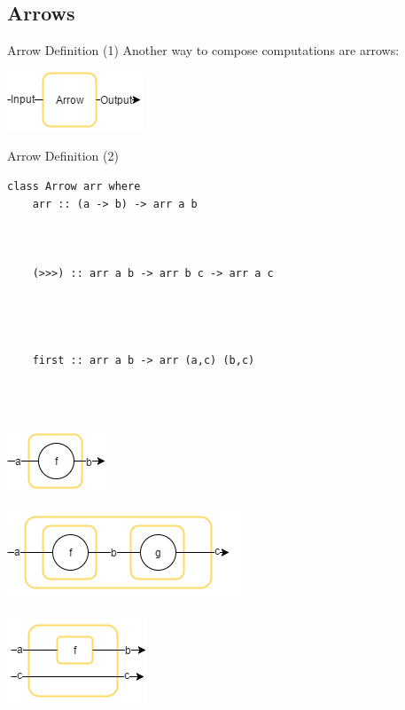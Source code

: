 \subsection{Arrows}
\begin{frame}[fragile]{Arrow Definition (1)}
\centering Another way to compose computations are arrows:
\begin{center}
	\includegraphics[scale=0.6]{images/arrow}~\\
\end{center}
\end{frame}

\begin{frame}[fragile]{Arrow Definition (2)}
\begin{minipage}{0.6\textwidth}
\begin{lstlisting}[frame=htrbl, numbers=none]
class Arrow arr where
	arr :: (a -> b) -> arr a b
	
	
	
	(>>>) :: arr a b -> arr b c -> arr a c
	
	
	
	
	first :: arr a b -> arr (a,c) (b,c)
\end{lstlisting}
\vfill
\end{minipage}
\hspace*{0.03\textwidth}
\begin{minipage}{0.25\textwidth}
	~\\~\\~\\
	\includegraphics[scale=0.6]{images/arr}~\\~\\
	\includegraphics[scale=0.6]{images/compose}~\\~\\
	\includegraphics[scale=0.6]{images/first}~\\~\\
\end{minipage}
\end{frame}

